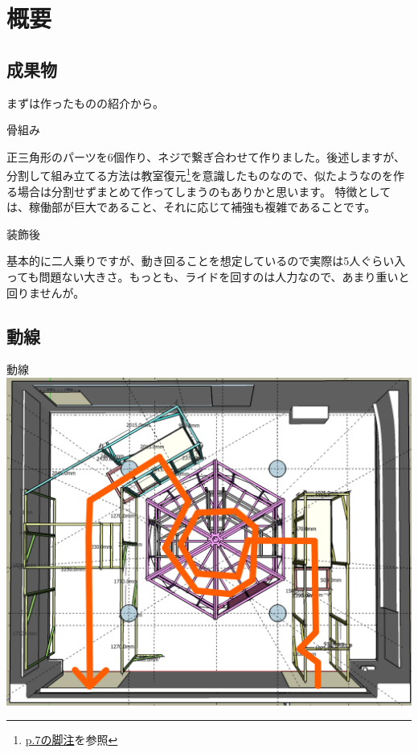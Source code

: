 \documentclass[uplatex,dvipdfmx]{jsarticle}
\begin{document}
\section{概要}
\subsection{成果物}

まずは作ったものの紹介から。

\begin{imageHere}{骨組み}
\end{imageHere}

正三角形のパーツを6個作り、ネジで繋ぎ合わせて作りました。後述しますが、分割して組み立てる方法は教室復元\footnote{\hyperlink{note:教室復元}{p.7の脚注}を参照}を意識したものなので、似たようなのを作る場合は分割せずまとめて作ってしまうのもありかと思います。
特徴としては、稼働部が巨大であること、それに応じて補強も複雑であることです。


\begin{imageHere}{装飾後}
    \begin{minipage}{0.45\linewidth}
        \centering
    \end{minipage}\hfill
    \begin{minipage}{0.45\linewidth}
        \centering
    \end{minipage}
\end{imageHere}

基本的に二人乗りですが、動き回ることを想定しているので実際は5人ぐらい入っても問題ない大きさ。もっとも、ライドを回すのは人力なので、あまり重いと回りませんが。

\clearpage

\subsection{動線}

\begin{imageHere}{動線}
    \includegraphics[width=0.6\linewidth]{images/plan_overview/lane.png}
\end{imageHere}
\end{document}
